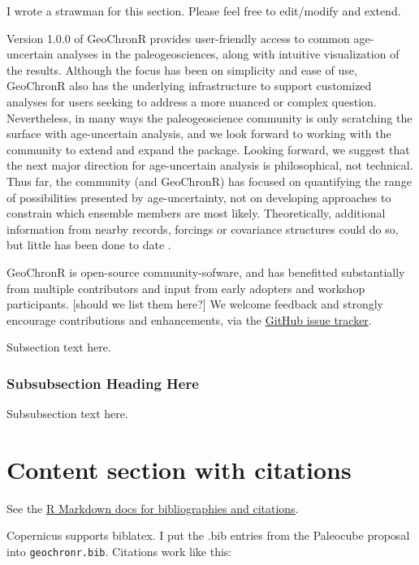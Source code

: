 \documentclass[gc, manuscript]{copernicus}
\begin{document}
\conclusions

I wrote a strawman for this section. Please feel free to edit/modify and
extend.

Version 1.0.0 of GeoChronR provides user-friendly access to common
age-uncertain analyses in the paleogeosciences, along with intuitive
visualization of the results. Although the focus has been on simplicity
and ease of use, GeoChronR also has the underlying infrastructure to
support customized analyses for users seeking to address a more nuanced
or complex question. Nevertheless, in many ways the paleogeoscience
community is only scratching the surface with age-uncertain analysis,
and we look forward to working with the community to extend and expand
the package. Looking forward, we suggest that the next major direction
for age-uncertain analysis is philosophical, not technical. Thus far,
the community (and GeoChronR) has focused on quantifying the range of
possibilities presented by age-uncertainty, not on developing approaches
to constrain which ensemble members are most likely. Theoretically,
additional information from nearby records, forcings or covariance
structures could do so, but little has been done to date
\citep{wernerAndTingley}.

GeoChronR is open-source community-sofware, and has benefitted
substantially from multiple contributors and input from early adopters
and workshop participants. {[}should we list them here?{]} We welcome
feedback and strongly encourage contributions and enhancements, via the
\href{https://github.com/nickmckay/GeoChronR/issues}{GitHub issue
tracker}.

Subsection text here.

\subsubsection{Subsubsection Heading Here}

Subsubsection text here.

\section{Content section with citations}

See the
\href{http://rmarkdown.rstudio.com/authoring_bibliographies_and_citations.html}{R
Markdown docs for bibliographies and citations}.

Copernicus supports biblatex. I put the .bib entries from the Paleocube
proposal into \texttt{geochronr.bib}. Citations work like this:
\end{document}
